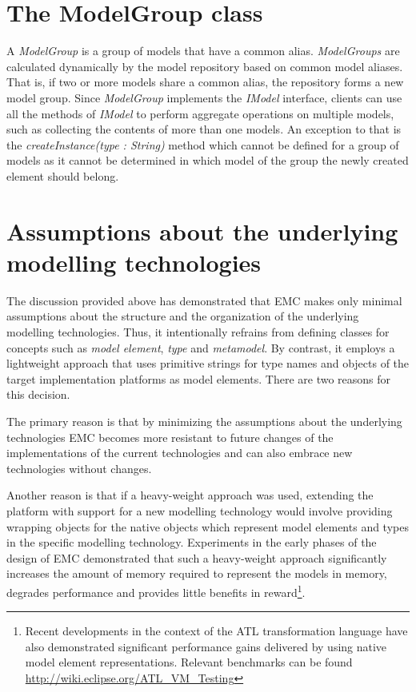 \section{The ModelGroup class}

A \emph{ModelGroup} is a group of models that have a common alias. \emph{ModelGroups} are calculated dynamically by the model repository based on common model aliases. That is, if two or more models share a common alias, the repository forms a new model group. Since \emph{ModelGroup} implements the \emph{IModel} interface, clients can use all the methods of \emph{IModel} to perform aggregate operations on multiple models, such as collecting the contents of more than one models. An exception to that is the \emph{createInstance(type : String)} method which cannot be defined for a group of models as it cannot be determined in which model of the group the newly created element should belong.

\section{Assumptions about the underlying modelling technologies}

The discussion provided above has demonstrated that EMC makes only minimal assumptions about the structure and the organization of the underlying modelling technologies. Thus, it intentionally refrains from defining classes for concepts such as \emph{model element}, \emph{type} and \emph{metamodel}. By contrast, it employs a lightweight approach that uses primitive strings for type names and objects of the target implementation platforms as  model elements. There are two reasons for this decision.

The primary reason is that by minimizing the assumptions about the underlying technologies EMC becomes more resistant to future changes of the implementations of the current technologies and can also embrace new technologies without changes.

Another reason is that if a heavy-weight approach was used, extending the platform with support for a new modelling technology would involve providing wrapping objects for the native objects which represent model elements and types in the specific modelling technology. Experiments in the early phases of the design of EMC demonstrated that such a heavy-weight approach significantly increases the amount of memory required to represent the models in memory, degrades performance and provides little benefits in reward\footnote{Recent developments in the context of the ATL transformation language have also demonstrated significant performance gains delivered by using native model element representations. Relevant benchmarks can be found \url{http://wiki.eclipse.org/ATL_VM_Testing}}.

